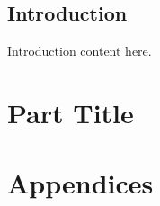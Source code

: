 \documentclass[11pt,letterpaper,openany,oldfontcommands]{memoir}
\begin{document}
\clearpage
\tableofcontents*

\clearpage
\chapter{Introduction}
\label{ch:intro}

Introduction content here.


\mainmatter

\part{Part Title}
\label{part:one}





\backmatter

\appendix
\part{Appendices}


\end{document}
